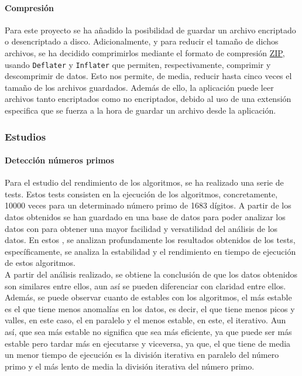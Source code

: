 \paragraph{Compresión}
Para este proyecto se ha añadido la posibilidad de guardar un archivo encriptado o desencriptado a disco. Adicionalmente, y para reducir el tamaño de dichos archivos, se ha decidido comprimirlos mediante el formato de compresión \href{https://en.wikipedia.org/wiki/ZIP_(file_format)}{ZIP}, usando \texttt{Deflater} y \texttt{Inflater} que permiten, respectivamente, comprimir y descomprimir  de datos. Esto nos permite, de media, reducir hasta cinco veces el tamaño de los archivos guardados. Además de ello, la aplicación puede leer archivos tanto encriptados como no encriptados, debido al uso de una extensión especifica que se fuerza a la hora de guardar un archivo desde la aplicación. 

\subsubsection{Estudios}\label{sec:algt_studies}
    
\paragraph{Detección números primos}\label{Prime study}

 Para el estudio del rendimiento de los algoritmos, se ha realizado una serie de tests. Estos tests consisten en la ejecución de los algoritmos, concretamente, 10000 veces para un determinado número primo de 1683 dígitos. A partir de los datos obtenidos se han guardado en una base de datos para poder analizar los datos con  para obtener una mayor facilidad y versatilidad del análisis de los datos. En estos , se analizan profundamente los resultados obtenidos de los tests, específicamente, se analiza la estabilidad y el rendimiento en tiempo de ejecución de estos algoritmos.\\

 A partir del análisis realizado, se obtiene la conclusión de que los datos obtenidos son similares entre ellos, aun así se pueden diferenciar con claridad entre ellos. Además, se puede observar cuanto de estables con los algoritmos, el más estable es el que tiene menos anomalías en los datos, es decir, el que tiene menos picos y valles, en este caso, el  en paralelo y el menos estable, en este, el  iterativo. Aun así, que sea más estable no significa que sea más eficiente, ya que puede ser más estable pero tardar más en ejecutarse y viceversa, ya que, el que tiene de media un menor tiempo de ejecución es la división iterativa en paralelo del número primo y el más lento de media la división iterativa del número primo.\\
 
